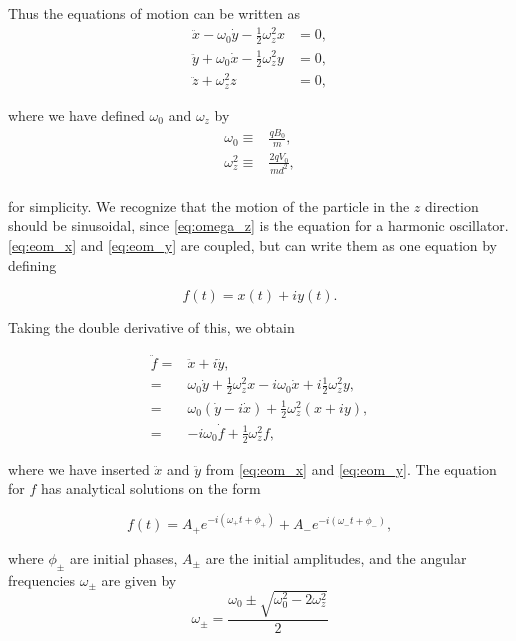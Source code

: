Thus the equations of motion can be written as
\begin{align}
      \ddot{x} - \omega_{0}\dot{y} - \frac{1}{2}\omega_{z}^{2}x &= 0, \label{eq:eom_x}\\
  \ddot{y} + \omega_{0}\dot{x} - \frac{1}{2}\omega_{z}^{2}y &= 0, \label{eq:eom_y}\\
  \ddot{z} + \omega_{z}^{2}z &= 0, \label{eq:eom_z}
\end{align}

where we have defined $\omega_0$ and $\omega_z$ by
\begin{align}
\omega_0 \equiv& \frac{qB_0}{m}, \label{eq:omega_0} \\
\omega_z^2 \equiv& \frac{2qV_0}{md^2}, \label{eq:omega_z} \\
\end{align}

for simplicity. We recognize that the motion of the particle in the $z$ direction
should be sinusoidal, since \autoref{eq:omega_z} is the equation for a harmonic oscillator.
\autoref{eq:eom_x} and \autoref{eq:eom_y} are coupled, but can write them as one equation by defining

\begin{equation}
f(t) = x(t) + iy(t).
\end{equation}

Taking the double derivative of this, we obtain

\begin{align}
\ddot{f} =& \ddot{x} + i\ddot{y}, \\
=& \omega_0\dot{y} + \frac{1}{2}\omega_z^2x - i\omega_0\dot{x} + i\frac{1}{2}\omega_z^2y, \\
=& \omega_0\left(\dot{y} - i\dot{x}\right) + \frac{1}{2} \omega_z^2\left(x + iy\right), \\
=& -i\omega_0 \dot{f} + \frac{1}{2}\omega_z^2f,
\end{align}

where we have inserted $\ddot{x}$ and $\ddot{y}$ from \autoref{eq:eom_x} and \autoref{eq:eom_y}. The equation for $f$ has analytical solutions on the form

\begin{equation}
f(t) = A_+e^{-i(\omega_+t + \phi_+)} + A_-e^{-i(\omega_-t  + \phi_-)},
\label{eq:f_gen_sol}
\end{equation}


where $\phi_{\pm}$ are initial phases,  $A_{\pm}$ are the initial amplitudes,
and the angular frequencies $\omega_{\pm}$ are given by
\begin{equation}
\omega_\pm = \frac{\omega_0 \pm \sqrt{\omega_0^2 - 2\omega_z^2}}{2}
\label{eq:omega_pm}
\end{equation}

